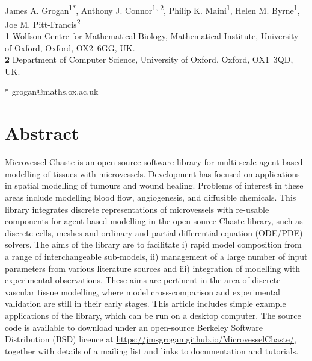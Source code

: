 \documentclass[10pt,letterpaper]{article}
\date{}
\begin{document}
\vspace*{0.2in}

\begin{flushleft}
{\Large
\textbf{} %
}
\newline
\\
James A. Grogan\textsuperscript{1*},
Anthony J. Connor\textsuperscript{1, 2},
Philip K. Maini\textsuperscript{1},
Helen M. Byrne\textsuperscript{1},
Joe M. Pitt-Francis\textsuperscript{2}
\\
\bigskip
\textbf{1} Wolfson Centre for Mathematical Biology, Mathematical Institute, University of Oxford, Oxford, \mbox{OX2 6GG}, UK.
\\
\textbf{2} Department of Computer Science, University of Oxford, Oxford, \mbox{OX1 3QD}, UK.
\\
\bigskip


* grogan@maths.ox.ac.uk

\end{flushleft}

\section*{Abstract}
Microvessel Chaste is an open-source software library for multi-scale agent-based modelling of tissues with microvessels. Development has focused on applications in spatial modelling of tumours and wound healing. Problems of interest in these areas include modelling blood flow, angiogenesis, and diffusible chemicals. This library integrates discrete representations of microvessels with re-usable components for agent-based modelling in the open-source Chaste library, such as discrete cells, meshes and ordinary and partial differential equation (ODE/PDE) solvers. The aims of the library are to facilitate i) rapid model composition from a range of interchangeable sub-models, ii) management of a large number of input parameters from various literature sources and iii) integration of modelling with experimental observations. These aims are pertinent in the area of discrete vascular tissue modelling, where model cross-comparison and experimental validation are still in their early stages. This article includes simple example applications of the library, which can be run on a desktop computer. The source code is available to download under an open-source Berkeley Software Distribution (BSD) licence at \url{https://jmsgrogan.github.io/MicrovesselChaste/}, together with details of a mailing list and links to documentation and tutorials.
\end{document}
